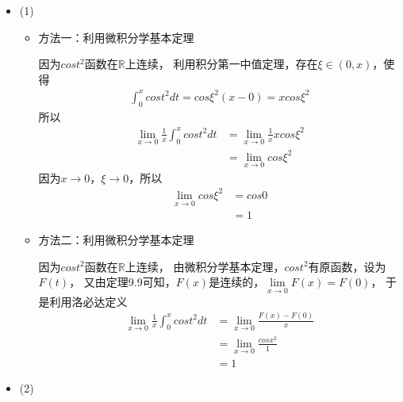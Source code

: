 \documentclass{article}
\begin{document}
\begin{itemize}
  \item (1)

        \begin{itemize}
          \item 方法一：利用微积分学基本定理

                因为$cos t^2$函数在$\mathbb{R}$上连续，
                利用积分第一中值定理，存在$\xi \in (0, x)$，使得
                \begin{align*}
                  \int_0^x cos t^2 dt = cos \xi^2 (x - 0) = x cos \xi^2
                \end{align*}
                所以
                \begin{align*}
                  \lim \limits_{x \to 0} \frac{1}{x} \int_0^x cos t^2 dt
                   & = \lim \limits_{x \to 0} \frac{1}{x} x cos \xi^2 \\
                   & = \lim \limits_{x \to 0} cos \xi^2
                \end{align*}
                因为$x \to 0$，$\xi \to 0$，所以
                \begin{align*}
                  \lim \limits_{x \to 0} cos \xi^2
                   & = cos 0 \\
                   & = 1
                \end{align*}

          \item 方法二：利用微积分学基本定理

                因为$cos t^2$函数在$\mathbb{R}$上连续，
                由微积分学基本定理，$cos t^2$有原函数，设为$F(t)$，
                又由定理9.9可知，$F(x)$是连续的，$\lim\limits_{x \to 0} F(x) = F(0)$，
                于是利用洛必达定义
                \begin{align*}
                  \lim \limits_{x \to 0} \frac{1}{x} \int_0^x cos t^2 dt
                   & = \lim \limits_{x \to 0} \frac{F(x) - F(0)}{x} \\
                   & = \lim \limits_{x \to 0} \frac{cos x^2}{1}     \\
                   & = 1
                \end{align*}
        \end{itemize}

  \item (2)


\end{itemize}
\end{document}
